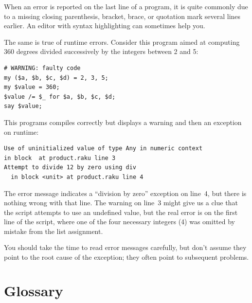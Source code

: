 When an error is reported on the last line of a program, 
it is quite commonly due to a missing closing parenthesis, 
bracket, brace, or quotation mark several lines earlier. 
An editor with syntax highlighting can sometimes help you.


The same is true of runtime errors. Consider this program 
aimed at computing 360 degrees divided successively by 
the integers between 2 and 5:

\begin{verbatim}
# WARNING: faulty code
my ($a, $b, $c, $d) = 2, 3, 5;
my $value = 360;
$value /= $_ for $a, $b, $c, $d;
say $value;
\end{verbatim}

This programs compiles correctly but displays a warning and 
then an exception on runtime:

\begin{verbatim}
Use of uninitialized value of type Any in numeric context 
in block  at product.raku line 3
Attempt to divide 12 by zero using div
  in block <unit> at product.raku line 4
\end{verbatim}
%

The error message indicates a ``division by zero'' exception 
on line~4, but there is nothing wrong with that line. 
The warning on line~3 might give us a clue that the 
script attempts to use an undefined value, but the real error 
is on the first line of the script, where one of the four 
necessary integers (4) was omitted by mistake from the list 
assignment.


You should take the time to read error messages carefully, 
but don't assume they point to the root cause of the 
exception; they often point to subsequent problems.


\section{Glossary}

